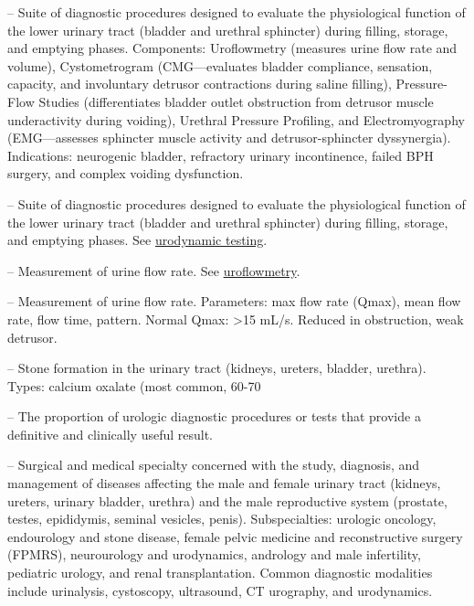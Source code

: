 -- Suite of diagnostic procedures designed to evaluate the physiological function of the lower urinary tract (bladder and urethral sphincter) during filling, storage, and emptying phases. Components: Uroflowmetry (measures urine flow rate and volume), Cystometrogram (CMG—evaluates bladder compliance, sensation, capacity, and involuntary detrusor contractions during saline filling), Pressure-Flow Studies (differentiates bladder outlet obstruction from detrusor muscle underactivity during voiding), Urethral Pressure Profiling, and Electromyography (EMG—assesses sphincter muscle activity and detrusor-sphincter dyssynergia). Indications: neurogenic bladder, refractory urinary incontinence, failed BPH surgery, and complex voiding dysfunction.


-- Suite of diagnostic procedures designed to evaluate the physiological function of the lower urinary tract (bladder and urethral sphincter) during filling, storage, and emptying phases. See \hyperlink{Urodynamic Testing}{urodynamic testing}.

-- Measurement of urine flow rate. See \hyperlink{Uroflowmetry}{uroflowmetry}.

-- Measurement of urine flow rate. Parameters: max flow rate (Qmax), mean flow rate, flow time, pattern. Normal Qmax: >15 mL/s. Reduced in obstruction, weak detrusor.

-- Stone formation in the urinary tract (kidneys, ureters, bladder, urethra). Types: calcium oxalate (most common, 60-70%

-- The proportion of urologic diagnostic procedures or tests that provide a definitive and clinically useful result.

-- Surgical and medical specialty concerned with the study, diagnosis, and management of diseases affecting the male and female urinary tract (kidneys, ureters, urinary bladder, urethra) and the male reproductive system (prostate, testes, epididymis, seminal vesicles, penis). Subspecialties: urologic oncology, endourology and stone disease, female pelvic medicine and reconstructive surgery (FPMRS), neurourology and urodynamics, andrology and male infertility, pediatric urology, and renal transplantation. Common diagnostic modalities include urinalysis, cystoscopy, ultrasound, CT urography, and urodynamics.

